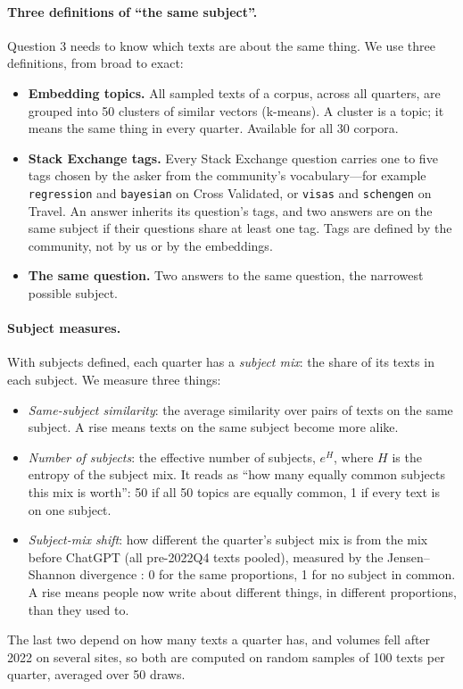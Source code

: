 \documentclass[11pt]{article}
\begin{document}
\paragraph{Three definitions of ``the same subject''.} Question 3 needs to know which texts are about
the same thing. We use three definitions, from broad to exact:
\begin{itemize}
  \item \textbf{Embedding topics.} All sampled texts of a corpus, across all quarters, are grouped into
  50 clusters of similar vectors (k-means). A cluster is a topic; it means the same thing in every
  quarter. Available for all 30 corpora.
  \item \textbf{Stack Exchange tags.} Every Stack Exchange question carries one to five tags chosen by
  the asker from the community's vocabulary---for example \texttt{regression} and \texttt{bayesian}
  on Cross Validated, or \texttt{visas} and \texttt{schengen} on Travel. An answer inherits its
  question's tags, and two answers are on the same subject if their questions share at least one tag.
  Tags are defined by the community, not by us or by the embeddings.
  \item \textbf{The same question.} Two answers to the same question, the narrowest possible subject.
\end{itemize}

\paragraph{Subject measures.} With subjects defined, each quarter has a \emph{subject mix}: the share
of its texts in each subject. We measure three things:
\begin{itemize}
  \item \emph{Same-subject similarity}: the average similarity over pairs of texts on the same
  subject. A rise means texts on the same subject become more alike.
  \item \emph{Number of subjects}: the effective number of subjects, $e^{H}$, where $H$ is the
  entropy of the subject mix. It reads as ``how many equally common subjects this mix is worth'':
  50 if all 50 topics are equally common, 1 if every text is on one subject.
  \item \emph{Subject-mix shift}: how different the quarter's subject mix is from the mix before
  ChatGPT (all pre-2022Q4 texts pooled), measured by the Jensen--Shannon divergence \citep{lin1991}:
  0 for the same proportions, 1 for no subject in common. A rise means people now write about
  different things, in different proportions, than they used to.
\end{itemize}
The last two depend on how many texts a quarter has, and volumes fell after 2022 on several sites, so
both are computed on random samples of 100 texts per quarter, averaged over 50 draws.
\end{document}
